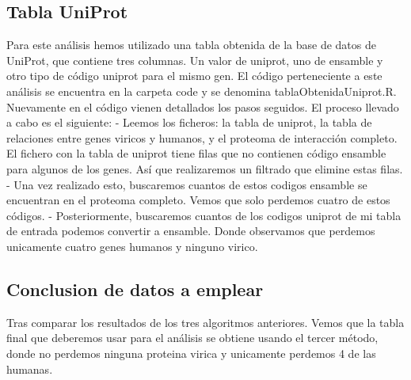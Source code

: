 \subsection{Tabla UniProt}
Para este análisis hemos utilizado una tabla obtenida de la base de datos de UniProt, que contiene tres columnas. Un valor de uniprot, uno de ensamble y otro tipo de código uniprot para el mismo gen. 
El código perteneciente a este análisis se encuentra en la carpeta code y se denomina tablaObtenidaUniprot.R. Nuevamente en el código vienen detallados los pasos seguidos. 
El proceso llevado a cabo es el siguiente:
- Leemos los ficheros: la tabla de uniprot, la tabla de relaciones entre genes viricos y humanos, y el proteoma de interacción completo. El fichero con la tabla de uniprot tiene filas que no contienen código ensamble para algunos de los genes. Así que realizaremos un filtrado que elimine estas filas.
- Una vez realizado esto, buscaremos cuantos de estos codigos ensamble se encuentran en el proteoma completo. Vemos que solo perdemos cuatro de estos códigos.
- Posteriormente, buscaremos cuantos de los codigos uniprot de mi tabla de entrada podemos convertir a ensamble. Donde observamos que perdemos unicamente cuatro genes humanos y ninguno virico.

\subsection{Conclusion de datos a emplear}
Tras comparar los resultados de los tres algoritmos anteriores. Vemos que la tabla final que deberemos usar para el análisis se obtiene usando el tercer método, donde no perdemos ninguna proteina virica y unicamente perdemos 4 de las humanas.


